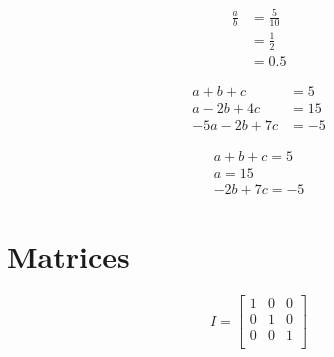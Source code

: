 \documentclass[a4paper, 12pt]{article}
\begin{document}
\begin{equation}
    \begin{split}
        \frac{a}{b} &= \frac{5}{10} \\
                    &= \frac{1}{2}  \\
                    &= 0.5
    \end{split}
\end{equation}

\begin{align}
    a + b + c &= 5 \\
    a - 2b + 4c &= 15 \\
    -5a - 2b + 7c &= -5
\end{align}

\begin{gather}
    a + b + c = 5 \\
    a = 15 \\
    - 2b + 7c = -5
\end{gather}

\section{Matrices}
\begin{equation*}
    I = \begin{bmatrix}
        1 & 0 & 0 \\
        0 & 1 & 0 \\
        0 & 0 & 1 \\
    \end{bmatrix}
\end{equation*}
\end{document}
